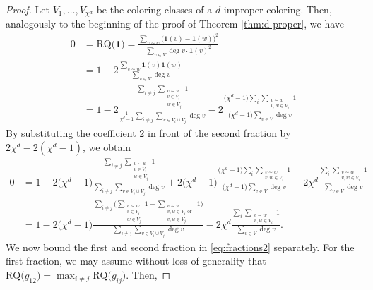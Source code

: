 \documentclass{article}
\newcommand{\RQ}{\textrm{RQ}}
\theoremstyle{plain}
\theoremstyle{definition}
\theoremstyle{remark}
\begin{document}
\begin{proof}
    Let $V_1,\ldots,V_{\chi^d}$ be the coloring classes of a $d$-improper coloring. Then, analogously  to the beginning of the proof of Theorem \ref{thm:d-proper}, we have
    \begin{align*}
    0 &= \RQ\bigl(\boldsymbol 1\bigr) = \frac{\sum_{v\sim w}\bigl(\boldsymbol 1(v)-\boldsymbol 1(w)\bigr)^2}{\sum_{v\in V}\deg v\cdot \boldsymbol 1(v)^2}\\
        &= 1 - 2\frac{\sum_{v\sim w}\boldsymbol 1(v)\boldsymbol 1(w)}{\sum_{v\in V}\deg v}\\
       &= 1-2\frac{\sum_{i\neq j}\sum_{\substack{v\sim w\\ v\in V_i\\w\in V_j}}1}{\frac1{\chi^d-1}\sum_{i\neq j}\sum_{v\in V_i\cup V_j}\deg v}-2\frac{\bigl(\chi^d-1\bigr)\sum_i\sum_{\substack{v\sim w\\ v,w\in V_i}}1}{\bigl(\chi^d-1\bigr)\sum_{v\in V}\deg v}
    \end{align*}    
    By substituting the coefficient $2$ in front of the second fraction by $2\chi^d-2(\chi^d-1)$, we obtain
    \begin{align}
       \nonumber  0  &= 1-2\bigl(\chi^d-1\bigr)\frac{\sum_{i\neq j}\sum_{\substack{v\sim w\\ v\in V_i\\ w\in V_j}}1}{\sum_{i\neq j}\sum_{v\in V_i\cup V_j}\deg v} +2\bigl(\chi^d-1\bigr)\frac{\bigl(\chi^d-1\bigr)\sum_i\sum_{\substack{v\sim w\\ v,w\in V_i}}1}{\bigl(\chi^d-1\bigr)\sum_{v\in V}\deg v} -2\chi^d\frac{\sum_i\sum_{\substack{v\sim w\\v,w\in V_i}}1}{\sum_{v\in V}\deg v}\\
       \label{eq:fractions2}    &= 1-2\bigl(\chi^d-1\bigr)\frac{\sum_{i\neq j}\biggl(\sum_{\substack{v\sim w\\ v\in V_i\\ w\in V_j}}1 - \sum_{\substack{v\sim w\\ v,w\in V_i \text{ or }\\ v,w\in V_j}}1\biggr)}{\sum_{i\neq j}\sum_{v\in V_i\cup V_j}\deg v} -2\chi^d \frac{\sum_i\sum_{\substack{v\sim w\\v,w\in V_i}}1}{\sum_{v\in V}\deg v}.
    \end{align}
    We now bound the first and second fraction in \eqref{eq:fractions2} separately. For the first fraction, we 
    may assume without loss of generality that $\RQ\bigl(g_{12}\bigr) = \max_{i\neq j}\RQ\bigl(g_{ij}\bigr)$. Then,

\end{proof}
\end{document}
